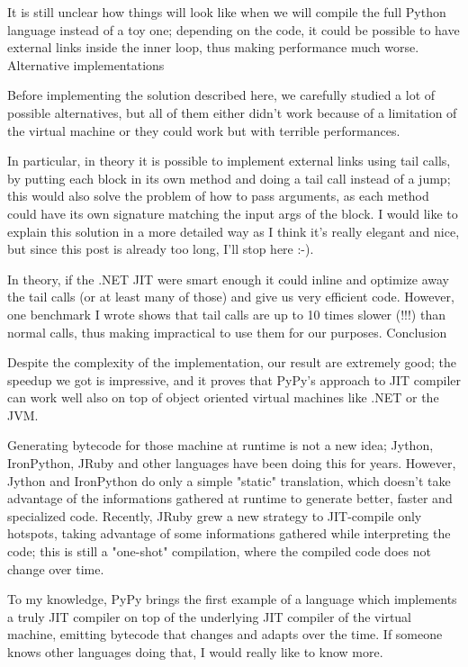 {It is still unclear how things will look like when we will compile the full Python language instead of a toy one; depending on the code, it could be possible to have external links inside the inner loop, thus making performance much worse.
Alternative implementations

Before implementing the solution described here, we carefully studied a lot of possible alternatives, but all of them either didn't work because of a limitation of the virtual machine or they could work but with terrible performances.

In particular, in theory it is possible to implement external links using tail calls, by putting each block in its own method and doing a tail call instead of a jump; this would also solve the problem of how to pass arguments, as each method could have its own signature matching the input args of the block. I would like to explain this solution in a more detailed way as I think it's really elegant and nice, but since this post is already too long, I'll stop here :-).

In theory, if the .NET JIT were smart enough it could inline and optimize away the tail calls (or at least many of those) and give us very efficient code. However, one benchmark I wrote shows that tail calls are up to 10 times slower (!!!) than normal calls, thus making impractical to use them for our purposes.
Conclusion

Despite the complexity of the implementation, our result are extremely good; the speedup we got is impressive, and it proves that PyPy's approach to JIT compiler can work well also on top of object oriented virtual machines like .NET or the JVM.

Generating bytecode for those machine at runtime is not a new idea; Jython, IronPython, JRuby and other languages have been doing this for years. However, Jython and IronPython do only a simple "static" translation, which doesn't take advantage of the informations gathered at runtime to generate better, faster and specialized code. Recently, JRuby grew a new strategy to JIT-compile only hotspots, taking advantage of some informations gathered while interpreting the code; this is still a "one-shot" compilation, where the compiled code does not change over time.

To my knowledge, PyPy brings the first example of a language which implements a truly JIT compiler on top of the underlying JIT compiler of the virtual machine, emitting bytecode that changes and adapts over the time. If someone knows other languages doing that, I would really like to know more.

}
